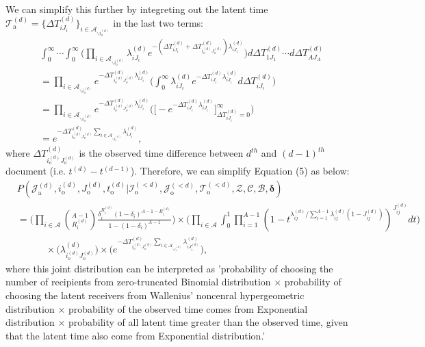 \documentclass[a4paper]{article}
\begin{document}
\\ \newline
We can simplify this further by integreting out the latent time $\mathcal{T}^{(d)}_{\mbox{a}}=\{\Delta T^{(d)}_{iJ_i}\}_{i \in \mathcal{A}_{\backslash i_o^{(d)}}}$ in the last two terms:
\begin{equation}
\begin{aligned}
&\int_{0}^\infty\cdots\int_{0}^\infty \Big(\prod_{i\in \mathcal{A}_{\backslash i_o^{(d)}}} \lambda^{(d)}_{iJ_i}e^{-(\Delta T^{(d)}_{iJ_i} + \Delta T^{(d)}_{i_o^{(d)}J_o^{(d)}})\lambda^{(d)}_{iJ_i}} \Big)d\Delta T^{(d)}_{1J_1}\cdots d\Delta T^{(d)}_{AJ_A}\\&
= \prod_{i\in \mathcal{A}_{\backslash i_o^{(d)}}} e^{- \Delta T^{(d)}_{i_o^{(d)}J_o^{(d)}}\lambda^{(d)}_{iJ_i}} \Big(\int_{0}^\infty \lambda^{(d)}_{iJ_i}e^{-\Delta T^{(d)}_{iJ_i} \lambda^{(d)}_{iJ_i}}  d\Delta T^{(d)}_{iJ_i}\Big)
\\& =\prod_{i\in \mathcal{A}_{\backslash i_o^{(d)}}} e^{- \Delta T^{(d)}_{i_o^{(d)}J_o^{(d)}}\lambda^{(d)}_{iJ_i}} \Big(\Big [ - e^{-\Delta T^{(d)}_{iJ_i} \lambda^{(d)}_{iJ_i}}\Big]_{\Delta T^{(d)}_{iJ_i}  = 0} ^{\infty}\Big)
\\& = e^{- \Delta T^{(d)}_{i_o^{(d)}J_o^{(d)}}\sum_{i\in \mathcal{A}_{\backslash i_o^{(d)}}}\lambda^{(d)}_{iJ_i}},
\end{aligned}
\end{equation}
where $\Delta T^{(d)}_{i_o^{(d)}J_o^{(d)}}$ is the observed time difference between $d^{th}$ and $(d-1)^{th}$ document (i.e. $t^{(d)}-t^{(d-1)}$).
Therefore, we can simplify Equation (5) as below:
\begin{equation}
\begin{aligned}
&P(\mathcal{J}^{(d)}_{\mbox{a}}, i^{(d)}_{\mbox{o}}, J^{(d)}_{\mbox{o}}, t^{(d)}_{\mbox{o}} |\mathcal{I}^{(<d)}_{\mbox{o}}, \mathcal{J}^{(<d)}_{\mbox{o}}, \mathcal{T}^{(<d)}_{\mbox{o}}, \mathcal{Z}, \mathcal{C}, \mathcal{B}, \boldsymbol{\delta})\\&=\Big(\prod_{i\in \mathcal{A}} {{A-1}\choose R_i^{(d)}} \frac{\delta_i^{ R_i^{(d)}} (1-\delta_i)^{A-1-R_i^{(d)}}}{1 - (1-\delta_i)^{A-1}}\Big) \times \Big(\prod_{i\in \mathcal{A}}\int_0^1\prod_{i=1}^{A-1}(1-t^{\lambda_{ij}^{(d)} /  \sum_{i = 1}^{A-1} \lambda_{ij}^{(d)}(1-J_{ij}^{(d)})})^{J_{ij}^{(d)}}dt \Big)\\&\quad\quad\quad\times \Big(\lambda^{(d)}_{i_o^{(d)}J_{o}^{(d)}}\Big)\times  \Big(e^{-\Delta T^{(d)}_{i_o^{(d)}J_o^{(d)}}\sum\limits_{i\in \mathcal{A}_{\backslash i_o^{(d)}}}\lambda^{(d)}_{iJ^{(d)}_{i}}}\Big),
\end{aligned}
\end{equation}
where this joint distribution can be interpreted as 'probability of choosing the number of recipients from zero-truncated Binomial distribution $\times$ probability of choosing the latent receivers from Wallenius' noncenral hypergeometric distribution $\times$ probability of the observed time comes from Exponential distribution $\times$ probability of all latent time greater than the observed time, given that the latent time also come from Exponential distribution.'
\end{document}
